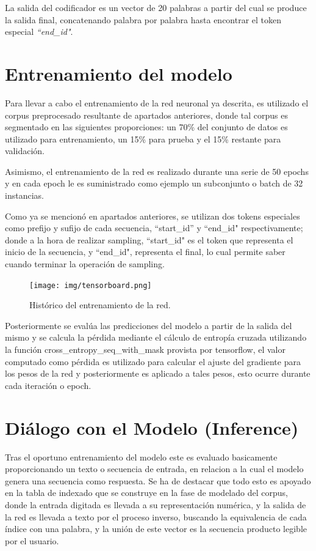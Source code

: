 \documentclass[12pt, letterpaper]{article}
\begin{document}
        
        La salida del codificador es un vector de 20 palabras a partir del cual se produce la salida final, concatenando palabra por palabra hasta encontrar el token especial \emph{“end\_id"}.

    \section{Entrenamiento del modelo}
        Para llevar a cabo el entrenamiento de la red neuronal ya descrita, es utilizado el corpus preprocesado resultante de apartados anteriores, donde tal corpus es segmentado en las siguientes proporciones: un 70\% del conjunto de datos es utilizado para entrenamiento, un 15\% para prueba y el 15\% restante para validación\cite{Britz_2015}.

        Asimismo, el entrenamiento de la red es realizado durante una serie de 50 epochs y en cada epoch le es suministrado como ejemplo un subconjunto o batch de 32 instancias. 
        
        Como ya se mencionó en apartados anteriores, se utilizan dos tokens especiales como prefijo y sufijo de cada secuencia, “start\_id” y “end\_id" respectivamente; donde a la hora de realizar sampling, “start\_id" es el token que representa el inicio de la secuencia, y “end\_id", representa el final, lo cual permite saber cuando terminar la operación de sampling.
        \begin{figure}[H]
            \centering
            \texttt{[image: img/tensorboard.png]}
            \caption{Histórico del entrenamiento de la red.}
        \end{figure}

        Posteriormente se evalúa las predicciones del modelo a partir de la salida del mismo y se calcula la pérdida mediante el cálculo de entropía cruzada utilizando la función cross\_entropy\_seq\_with\_mask provista por tensorflow, el valor computado como pérdida es utilizado para calcular el ajuste del gradiente para los pesos de la red y posteriormente es aplicado a tales pesos, esto ocurre durante cada iteración o epoch.

    \section{Diálogo con el Modelo (Inference)}
        Tras el oportuno entrenamiento del modelo este es evaluado basicamente proporcionando un texto o secuencia de entrada, en relacion a la cual el modelo genera una secuencia como respuesta. Se ha de destacar que todo esto es apoyado en la tabla de indexado que se construye en la fase de modelado del corpus, donde la entrada digitada es llevada a su representación numérica, y la salida de la red es llevada a texto por el proceso inverso, buscando la equivalencia de cada índice con una palabra, y la unión de este vector es la secuencia producto legible por el usuario.
        
\end{document}
